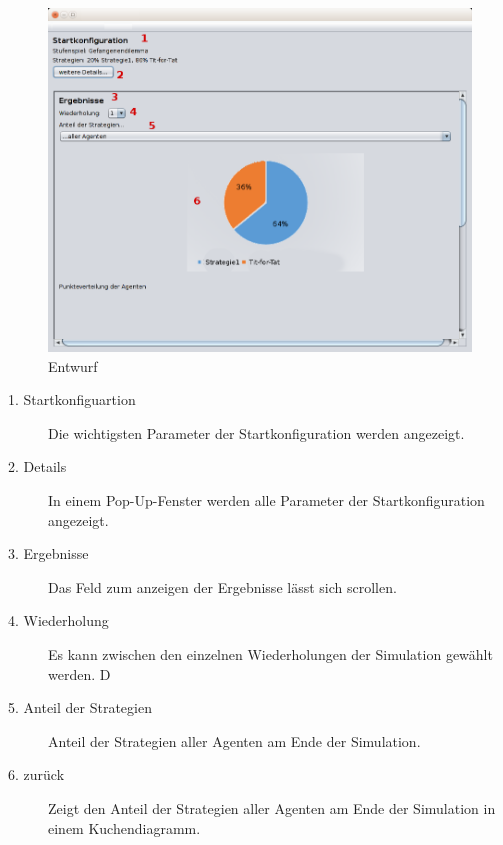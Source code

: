 \begin{figure}[hp] 
  \centering
     \includegraphics[width=1.2\textwidth]{GUI_Entwurf/Ergebnisfenster1.png}
  \caption{Entwurf}
  \label{fig:Bild1}
\end{figure}

\begin{description}

\item[1. Startkonfiguartion] Die wichtigsten Parameter der Startkonfiguration werden angezeigt.

\item[2. Details] In einem Pop-Up-Fenster werden alle Parameter der Startkonfiguration angezeigt.

\item[3. Ergebnisse] Das Feld zum anzeigen der Ergebnisse lässt sich scrollen.

\item[4. Wiederholung] Es kann zwischen den einzelnen Wiederholungen der Simulation gewählt werden. D

\item[5. Anteil der Strategien] Anteil der Strategien aller Agenten am Ende der Simulation. 

\item[6. zurück] Zeigt den Anteil der Strategien aller Agenten am Ende der Simulation in einem Kuchendiagramm. 

\end{description}

\pagebreak

